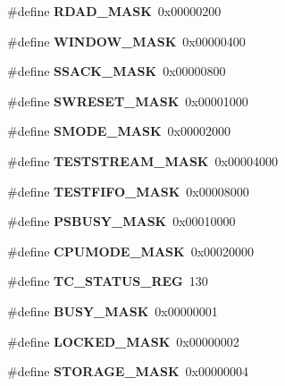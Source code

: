 \begin{DoxyCompactItemize}
\item 
\mbox{\label{_t_a_r_g_e_t_c___register_map_8h_a94ae0684a726848ec1ecb4e5840e31cc}} 
\#define {\bfseries R\+D\+A\+D\+\_\+\+M\+A\+SK}~0x00000200
\item 
\mbox{\label{_t_a_r_g_e_t_c___register_map_8h_a47f9d2a4d58cdfd1d178ca05bd3a5c17}} 
\#define {\bfseries W\+I\+N\+D\+O\+W\+\_\+\+M\+A\+SK}~0x00000400
\item 
\mbox{\label{_t_a_r_g_e_t_c___register_map_8h_adf3cac41f0ddf8414725e808d682b68d}} 
\#define {\bfseries S\+S\+A\+C\+K\+\_\+\+M\+A\+SK}~0x00000800
\item 
\mbox{\label{_t_a_r_g_e_t_c___register_map_8h_a16ee83208bcd1d26a5882850012aeab5}} 
\#define {\bfseries S\+W\+R\+E\+S\+E\+T\+\_\+\+M\+A\+SK}~0x00001000
\item 
\mbox{\label{_t_a_r_g_e_t_c___register_map_8h_a85a510fae85cfd4e624459edf02e404d}} 
\#define {\bfseries S\+M\+O\+D\+E\+\_\+\+M\+A\+SK}~0x00002000
\item 
\mbox{\label{_t_a_r_g_e_t_c___register_map_8h_a37a6f450b340fa97d3ee7193c767db89}} 
\#define {\bfseries T\+E\+S\+T\+S\+T\+R\+E\+A\+M\+\_\+\+M\+A\+SK}~0x00004000
\item 
\mbox{\label{_t_a_r_g_e_t_c___register_map_8h_a073c40dc6c27cf12d24ae5afb37d25bd}} 
\#define {\bfseries T\+E\+S\+T\+F\+I\+F\+O\+\_\+\+M\+A\+SK}~0x00008000
\item 
\mbox{\label{_t_a_r_g_e_t_c___register_map_8h_afdc9e8073d00d7022055ab159c9053b1}} 
\#define {\bfseries P\+S\+B\+U\+S\+Y\+\_\+\+M\+A\+SK}~0x00010000
\item 
\mbox{\label{_t_a_r_g_e_t_c___register_map_8h_ab04b91f2ac4e34719c5e3605f3e34bd2}} 
\#define {\bfseries C\+P\+U\+M\+O\+D\+E\+\_\+\+M\+A\+SK}~0x00020000
\item 
\mbox{\label{_t_a_r_g_e_t_c___register_map_8h_a14c1fe49c274c8d2b558d9f06876e2bc}} 
\#define {\bfseries T\+C\+\_\+\+S\+T\+A\+T\+U\+S\+\_\+\+R\+EG}~130
\item 
\mbox{\label{_t_a_r_g_e_t_c___register_map_8h_a1756efebd567c063f8a5c230e47d53d9}} 
\#define {\bfseries B\+U\+S\+Y\+\_\+\+M\+A\+SK}~0x00000001
\item 
\mbox{\label{_t_a_r_g_e_t_c___register_map_8h_a2f89f798b65218af57462a164d5b10a1}} 
\#define {\bfseries L\+O\+C\+K\+E\+D\+\_\+\+M\+A\+SK}~0x00000002
\item 
\mbox{\label{_t_a_r_g_e_t_c___register_map_8h_acd03059921c3be5f2e51640bd0bc42da}} 
\#define {\bfseries S\+T\+O\+R\+A\+G\+E\+\_\+\+M\+A\+SK}~0x00000004
\item 
\mbox{\label{_t_a_r_g_e_t_c___register_map_8h_ab8b77e044cc8d0c088d9d82ff5cbb73e}} 

\end{DoxyCompactItemize}
